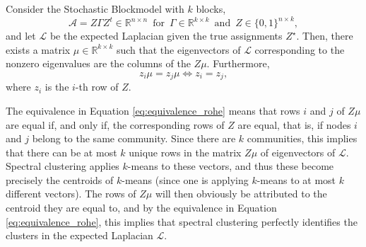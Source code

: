 \documentclass[../../main.tex]{subfiles} %
\begin{document}
	\begin{lemma}
		Consider the Stochastic Blockmodel with \(k\) blocks,
		\begin{equation*}
			\mathscr A = Z \Gamma Z^t \in \mathbb R^{n \times n} 
			\, \text{ for } \, \Gamma \in \mathbb R^{k \times k} \, \text{ and 
			} \, Z \in 
			\{0, 1\}^{n \times k},
		\end{equation*}
		and let \(\mathscr L\) be the expected Laplacian given the true 
		assignments \(Z^{\star}\). Then, there exists a matrix \(\mu \in 
		\mathbb R^{k \times k}\) such that the eigenvectors of \(\mathscr L\) 
		corresponding to the nonzero eigenvalues are the columns of the \(Z 
		\mu\). Furthermore,
		\begin{equation} \label{eq:equivalence_rohe}
			z_i \mu = z_j \mu \iff z_i = z_j,
		\end{equation}
		where \(z_i\) is the \(i\)-th row of \(Z\).
	\end{lemma}

	\begin{remark}
		The equivalence in Equation \ref{eq:equivalence_rohe} means that rows 
		\(i\) and \(j\) of \(Z \mu\) are equal if, and only if, the 
		corresponding rows of \(Z\) are equal, that is, if nodes \(i\) and 
		\(j\) belong to the same community. Since there are \(k\) communities, 
		this implies that there can be at most \(k\) unique rows in 
		the matrix \(Z \mu\) of eigenvectors of \(\mathscr L\). Spectral 
		clustering applies \(k\)-means to these vectors, and thus these become 
		precisely the centroids of \(k\)-means (since one is applying 
		\(k\)-means to at most \(k\) different vectors). The rows of \(Z \mu\) 
		will then obviously be attributed to the centroid they are equal to, 
		and by the equivalence in Equation \ref{eq:equivalence_rohe}, this 
		implies that spectral clustering perfectly identifies the clusters in 
		the expected Laplacian \(\mathscr L\).
	\end{remark}
\end{document}
